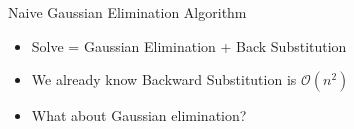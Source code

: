 \documentclass[10pt]{beamer}
\begin{document}
\begin{frame}[fragile]{Naive Gaussian Elimination Algorithm}



\vspace{5mm}
\begin{itemize}
    \item Solve = Gaussian Elimination + Back Substitution
    \item We already know Backward Substitution is $\mathcal{O}(n^2)$
    \item What about Gaussian elimination?
\end{itemize}
\vfill

\end{frame}
\end{document}
